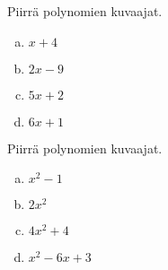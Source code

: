 \begin{tehtavasivu}
\begin{tehtava}
    Piirrä polynomien kuvaajat.
    \begin{enumerate}[a)]
        \item $x+4$
        \item $2x-9$
        \item $5x+2$
        \item $6x+1$
    \end{enumerate}
    \begin{vastaus}
        \item \begin{kuvaajapohja}{0.4}{-4}{4}{-1}{7}
			  \end{kuvaajapohja}
    	\item \begin{kuvaajapohja}{0.4}{-2}{6}{-6}{2}
			  \end{kuvaajapohja}
		\item \begin{kuvaajapohja}{0.4}{-4}{4}{-2}{6}
			  \end{kuvaajapohja}
		\item \begin{kuvaajapohja}{0.4}{-4}{4}{-2}{6}
			  \end{kuvaajapohja}
    \end{vastaus}
\end{tehtava}

\begin{tehtava}
    Piirrä polynomien kuvaajat.
    \begin{enumerate}[a)]
        \item $x^2-1$
        \item $2x^2$
        \item $4x^2+4$
        \item $x^2-6x+3$
    \end{enumerate}
    \begin{vastaus}
        \item \begin{kuvaajapohja}{0.4}{-4}{4}{-2}{6}
			  \end{kuvaajapohja}
    	\item \begin{kuvaajapohja}{0.4}{-4}{4}{-1}{7}
			  \end{kuvaajapohja}
		\item \begin{kuvaajapohja}{0.4}{-4}{4}{-1}{11}
			  \end{kuvaajapohja}
		\item \begin{kuvaajapohja}{0.4}{-1}{7}{-7}{5}
			  \end{kuvaajapohja}
    \end{vastaus}
\end{tehtava}


\end{tehtavasivu}
